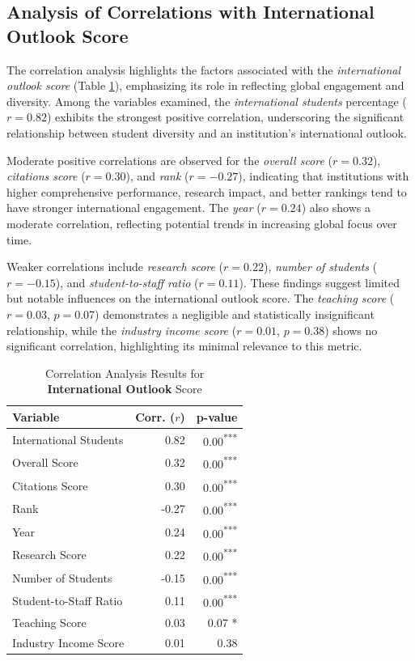\documentclass[sigconf]{acmart}
\begin{document}
\subsection{Analysis of Correlations with International Outlook Score}

The correlation analysis highlights the factors associated with the \textit{international outlook score} (Table \ref{tab:correlation_international_outlook}), emphasizing its role in reflecting global engagement and diversity. Among the variables examined, the \textit{international students} percentage ($r = 0.82$) exhibits the strongest positive correlation, underscoring the significant relationship between student diversity and an institution's international outlook.

Moderate positive correlations are observed for the \textit{overall score} ($r = 0.32$), \textit{citations score} ($r = 0.30$), and \textit{rank} ($r = -0.27$), indicating that institutions with higher comprehensive performance, research impact, and better rankings tend to have stronger international engagement. The \textit{year} ($r = 0.24$) also shows a moderate correlation, reflecting potential trends in increasing global focus over time.

Weaker correlations include \textit{research score} ($r = 0.22$), \textit{number of students} ($r = -0.15$), and \textit{student-to-staff ratio} ($r = 0.11$). These findings suggest limited but notable influences on the international outlook score. The \textit{teaching score} ($r = 0.03$, $p = 0.07$) demonstrates a negligible and statistically insignificant relationship, while the \textit{industry income score} ($r = 0.01$, $p = 0.38$) shows no significant correlation, highlighting its minimal relevance to this metric.

\begin{table}[h!]
	\centering
	\caption{Correlation Analysis Results for \textbf{International Outlook} Score}
	\label{tab:correlation_international_outlook}
	\begin{tabular}{|l|r|r|}
		\hline
		\textbf{Variable} & \textbf{Corr. ($r$)} & \textbf{p-value} \\
		\hline
		International Students & 0.82 & 0.00\textsuperscript{***} \\
		Overall Score & 0.32 & 0.00\textsuperscript{***} \\
		Citations Score & 0.30 & 0.00\textsuperscript{***} \\
		Rank & -0.27 & 0.00\textsuperscript{***} \\
		Year & 0.24 & 0.00\textsuperscript{***} \\
		Research Score & 0.22 & 0.00\textsuperscript{***} \\
		Number of Students & -0.15 & 0.00\textsuperscript{***} \\
		Student-to-Staff Ratio & 0.11 & 0.00\textsuperscript{***} \\
		Teaching Score & 0.03 & 0.07 * \\
		Industry Income Score & 0.01 & 0.38 \\
		\hline
	\end{tabular}
\end{table}
\end{document}
